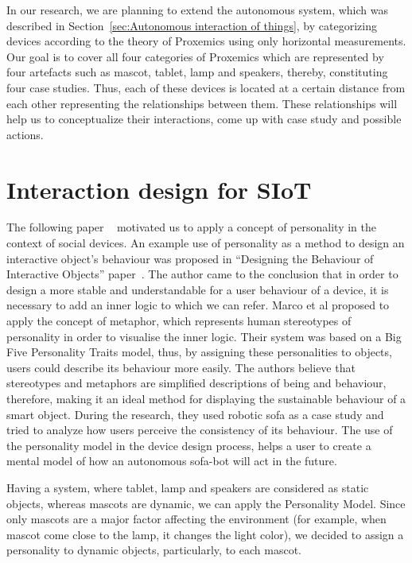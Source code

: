In our research, we are planning to extend the autonomous system, which was
described in Section~\ref{sec:Autonomous interaction of things}, by categorizing devices
according to the theory of Proxemics using only horizontal measurements.
Our goal is to cover all four categories of Proxemics which are represented by four
artefacts such as mascot, tablet, lamp and speakers, thereby, constituting four case studies.
Thus, each of these devices is located at a certain distance from each other representing
the relationships between them.
These relationships will help us to conceptualize their interactions, come up with case study and possible actions.

\section{Interaction design for SIoT}
\label{sec:Interaction design for SIoT}

The following paper ~\cite{soro2018social} motivated us to apply a concept of
personality in the context of social devices.
An example use of personality as a method to design an interactive object’s behaviour
was proposed in “Designing the Behaviour of Interactive Objects” paper~\cite{spadafora2016designing}.
The author came to the conclusion that in order to design a more stable and understandable
for a user behaviour of a device, it is necessary to add an inner logic to which we can refer.
Marco et al proposed to apply the concept of metaphor, which represents human stereotypes
of personality in order to visualise the inner logic.
Their system was based on a Big Five Personality Traits model, thus,
by assigning these personalities to objects, users could describe its behaviour more easily.
The authors believe that stereotypes and metaphors are simplified descriptions of being and behaviour,
therefore, making it an ideal method for displaying the sustainable behaviour of a smart object.
During the research, they used robotic sofa as a case study and tried to analyze how
users perceive the consistency of its behaviour.
The use of the personality model in the device design process, helps a user to create
a mental model of how an autonomous sofa-bot will act in the future.

Having a system, where tablet, lamp and speakers are considered as static objects,
whereas mascots are dynamic, we can apply the Personality Model.
Since only mascots are a major factor affecting the environment
(for example, when mascot come close to the lamp, it changes the light color), we decided to
assign a personality to dynamic objects, particularly, to each mascot.

